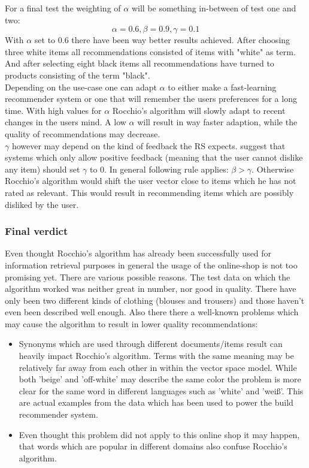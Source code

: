 \noindent
For a final test the weighting of $\alpha$ will be something in-between of test one and two:
$$\alpha = 0.6, \beta = 0.9, \gamma = 0.1$$
With $\alpha$ set to 0.6 there have been way better results achieved.
After choosing three white items all recommendations consisted of items with "white" as term.
\\
And after selecting eight black items all recommendations have turned to products consisting of the term "black".
\\

\noindent
Depending on the use-case one can adapt $\alpha$ to either make a fast-learning recommender system or one that will remember the users preferences for a long time.
With high values for $\alpha$ Rocchio's algorithm will slowly adapt to recent changes in the users mind.
A low $\alpha$ will result in way faster adaption, while the quality of recommendations may decrease.
\\

\noindent
$\gamma$ however may depend on the kind of feedback the RS expects.
\citeauthor{manning:2009} suggest that systems which only allow positive feedback (meaning that the user cannot dislike any item) should set $\gamma$ to 0.\citep[p.~183]{manning:2009}
In general following rule applies: $\beta > \gamma$.
Otherwise Rocchio's algorithm would shift the user vector close to items which he has not rated as relevant.
This would result in recommending items which are possibly disliked by the user.



\subsubsection{Final verdict}
Even thought Rocchio's algorithm has already been successfully used for information retrieval purposes in general \citep[p.~183]{manning:2009} the usage of the online-shop is not too promising yet.
There are various possible reasons.
The test data on which the algorithm worked was neither great in number, nor good in quality.
There have only been two different kinds of clothing (blouses and trousers) and those haven't even been described well enough.
Also there there a well-known problems which may cause the algorithm to result in lower quality recommendations:
\begin{itemize}
    \item Synonyms which are used through different documents/items result can heavily impact Rocchio's algorithm.
        Terms with the same meaning may be relatively far away from each other in within the vector space model.
        \citep[p.~184]{manning:2009}
        While both 'beige' and 'off-white' may describe the same color the problem is more clear for the same word in different languages such as 'white' and 'wei\ss{}'.
        This are actual examples from the data which has been used to power the build recommender system.

    \item Even thought this problem did not apply to this online shop it may happen, that words which are popular in different domains also confuse Rocchio's algorithm.
    \citep[p.~184]{manning:2009}
\end{itemize}


